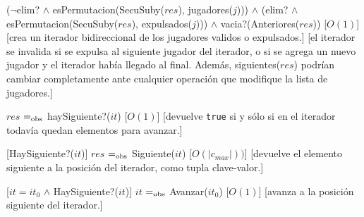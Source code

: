 \begin{Interfaz}
	{($\neg$elim? $\land$ esPermutacion(SecuSuby($res$), jugadores($j$))) $\land$ (elim? $\land$ esPermutacion(SecuSuby($res$), expulsados($j$))) $\land$ vacia?(Anteriores($res$))}
	[$O(1)$]
	[crea un iterador bidireccional de los jugadores validos o expulsados.]
	[el iterador se invalida si se expulsa al siguiente jugador del iterador, o si se agrega un nuevo jugador y el iterador había llegado al final. Además, siguientes($res$) podrían cambiar completamente ante cualquier operación que modifique la lista de jugadores.]

	{$res$ $=_{\mathrm{obs}}$ haySiguiente?($it$)}
	[$O(1)$]
	[devuelve \texttt{true} si y sólo si en el iterador todavía quedan elementos para avanzar.]

	[HaySiguiente?($it$)]
	{$res$ $=_{\mathrm{obs}}$ Siguiente($it$)}
	[$O(|c_{max}|))$]
	[devuelve el elemento siguiente a la posición del iterador, como tupla clave-valor.]

	[$it = it_0$ $\land$ HaySiguiente?($it$)]
	{$it$ $=_{\mathrm{obs}}$ Avanzar($it_0$)}
	[$O(1)$]
	[avanza a la posición siguiente del iterador.]

\end{Interfaz}

